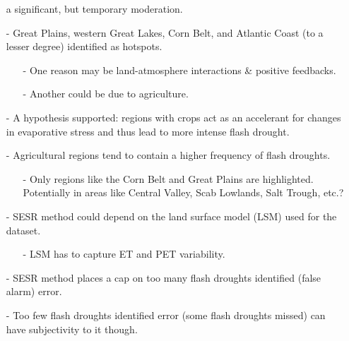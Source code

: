 \documentclass[12pt, letterpaper]{article}
\begin{document}
\begin{itemize}
                 a significant, but temporary moderation.
        \item[-] Great Plains, western Great Lakes, Corn Belt, and Atlantic Coast (to a lesser degree)
                 identified as hotspots.
        \begin{itemize}
        	\item[-] One reason may be land-atmosphere interactions  \& positive feedbacks.
        	\item[-] Another could be due to agriculture.
        \end{itemize}
        \item[-] A hypothesis supported: regions with crops act as an accelerant for changes in
                 evaporative stress and thus lead to more intense flash drought.
        \item[-] Agricultural regions tend to contain a higher frequency of flash droughts.
        \begin{itemize}
        	\item[-] Only regions like the Corn Belt and Great Plains are highlighted. Potentially
        	         in areas like Central Valley, Scab Lowlands, Salt Trough, etc.?
        \end{itemize}
        \item[-] SESR method could depend on the land surface model (LSM) used for the dataset.
        \begin{itemize}
        	\item[-] LSM has to capture ET and PET variability.
        \end{itemize}
        \item[-] SESR method places a cap on too many flash droughts identified (false alarm) error.
        \item[-] Too few flash droughts identified error (some flash droughts missed) can have 
                 subjectivity to it though.
    \end{itemize}
\end{document}
